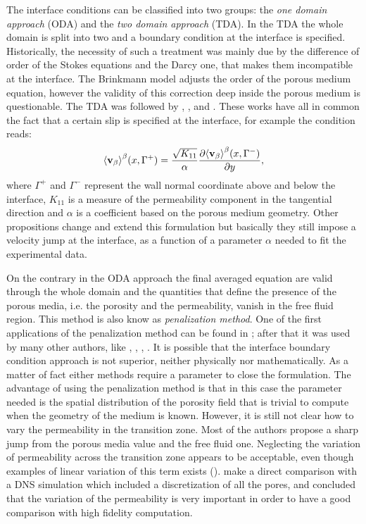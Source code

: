 The interface conditions can be classified into two groups: the \textit{one domain approach} (ODA) and the \textit{two domain approach} (TDA).
In the TDA the whole domain is split into two and a boundary condition at the interface is specified. Historically, the necessity of such a treatment was mainly due by the difference of order of the Stokes equations and the Darcy one, that makes them incompatible at the interface.
The Brinkmann model adjusts the order of the porous medium equation, however the validity of this correction deep inside the porous medium is questionable.
The TDA was followed by \citet{beaver}, \citet{mikelic2000interface}, \citet{ochoa1995momentum} and \citet{le2006interfacial}.
These works have all in common the fact that a certain slip is specified at the interface, for example the \citet{beaver} condition reads:
$$
{\left< \textbf{v}_{\beta} \right>}^{\beta}(x,\Gamma^+) = \dfrac{\sqrt{K_{11}}}{\alpha} \dfrac{\partial {\left< \textbf{v}_{\beta}\right>}^{\beta}(x, \Gamma^-)}{\partial y},
$$
where $\Gamma^+$ and $\Gamma^-$ represent the wall normal coordinate above and below the interface, $K_{11}$ is a measure of the permeability component in the tangential direction and $\alpha$ is a coefficient based on the porous medium geometry.
Other propositions change and extend this formulation but basically they still impose a velocity jump at the interface, as a function of a parameter $\alpha$ needed to fit the experimental data.

On the contrary in the ODA approach the final averaged equation are valid through the whole domain and the quantities that define the presence of the porous media, i.e. the porosity and the permeability, vanish in the free fluid region.
This method is also know as \textit{penalization method}. One of the first applications of the penalization method can be found in \citet{caltagirone1994interaction}; after that it was used by many other authors, like \citet{bruneau2004passive}, \citet{bruneau2008numerical}, \citet{bruneau2010coupling}, \citet{hussong2011continuum}.
It is possible that the interface boundary condition approach is not superior, neither physically nor mathematically.
As a matter of fact either methods require a parameter to close the formulation. The advantage of using the penalization method is that in this case the parameter needed is the spatial distribution of the porosity field that is trivial to compute when the geometry of the medium is known.
However, it is still not clear how to vary the permeability in the transition zone. Most of the authors propose a sharp jump from the porous media value and the free fluid one. Neglecting the variation of permeability across the transition zone appears to be acceptable, even though examples of linear variation of this term exists (\citet{caltagirone1994interaction}).
\citet{hussong2011continuum} make a direct comparison with a DNS simulation which included a discretization of all the pores, and concluded that the variation of the permeability is very important in order to have a good comparison with high fidelity computation.

